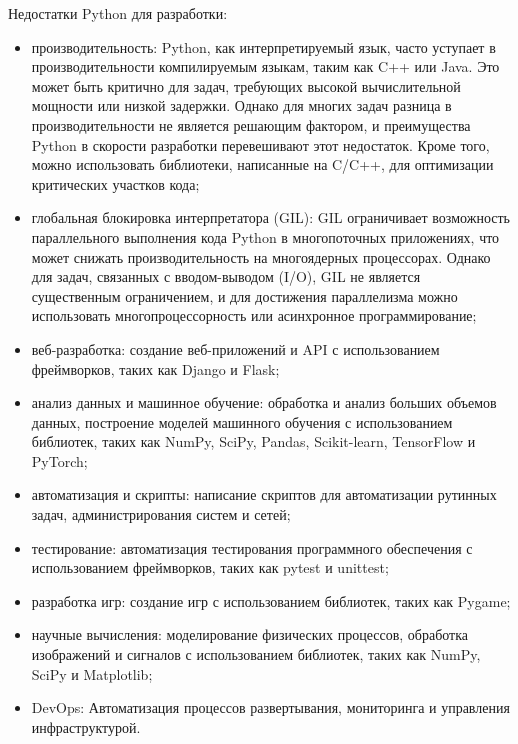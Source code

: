 Недостатки Python для разработки:
\begin{itemize}
\item	производительность: Python, как интерпретируемый язык, часто уступает в производительности компилируемым языкам, таким как C++ или Java. Это может быть критично для задач, требующих высокой вычислительной мощности или низкой задержки. Однако для многих задач разница в производительности не является решающим фактором, и преимущества Python в скорости разработки перевешивают этот недостаток. Кроме того, можно использовать библиотеки, написанные на C/C++, для оптимизации критических участков кода;

\item	глобальная блокировка интерпретатора (GIL): GIL ограничивает возможность параллельного выполнения кода Python в многопоточных приложениях, что может снижать производительность на многоядерных процессорах. Однако для задач, связанных с вводом-выводом (I/O), GIL не является существенным ограничением, и для достижения параллелизма можно использовать многопроцессорность или асинхронное программирование;

\item	веб-разработка: создание веб-приложений и API с использованием фреймворков, таких как Django и Flask;

\item	анализ данных и машинное обучение: обработка и анализ больших объемов данных, построение моделей машинного обучения с использованием библиотек, таких как NumPy, SciPy, Pandas, Scikit-learn, TensorFlow и PyTorch;

\item	автоматизация и скрипты: написание скриптов для автоматизации рутинных задач, администрирования систем и сетей;

\item	тестирование: автоматизация тестирования программного обеспечения с использованием фреймворков, таких как pytest и unittest;

\item	разработка игр: создание игр с использованием библиотек, таких как Pygame;

\item	научные вычисления: моделирование физических процессов, обработка изображений и сигналов с использованием библиотек, таких как NumPy, SciPy и Matplotlib;

\item	DevOps: Автоматизация процессов развертывания, мониторинга и управления инфраструктурой.


\end{itemize}
